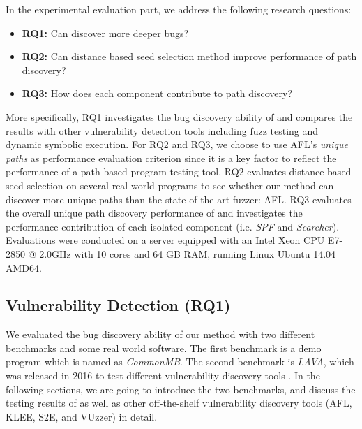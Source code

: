 In the experimental evaluation part, we address the following 
research questions:
\begin{itemize}
\setlength{\itemsep}{0pt}
\item {\textbf{RQ1:} Can \prototype discover more deeper bugs?}
\item {\textbf{RQ2:} Can distance based seed selection method 
	improve performance of path discovery?}
\item {\textbf{RQ3:} How does each component contribute to 
	path discovery?}
\end{itemize}

More specifically, RQ1 investigates the bug discovery ability of 
\prototype and compares the results with other vulnerability 
detection tools including fuzz testing and dynamic symbolic execution.
For RQ2 and RQ3, we choose to use AFL's \textit{unique paths} as performance evaluation criterion since it is a key factor to reflect the 
performance of a path-based program testing tool.
RQ2 evaluates distance based seed selection on several 
real-world programs to see whether our method can discover more 
unique paths than the state-of-the-art fuzzer: AFL. RQ3 evaluates 
the overall unique path discovery performance of \prototype and 
investigates the performance contribution of each isolated 
component (i.e. \textit{SPF} and \textit{Searcher}).
Evaluations were conducted on a server equipped
with an Intel Xeon CPU E7-2850 @ 2.0GHz with
10 cores and 64 GB RAM, running Linux Ubuntu 14.04 AMD64.

\subsection{Vulnerability Detection (RQ1)}
We evaluated the bug discovery ability of our method with two 
different benchmarks and some real world software. The first 
benchmark is a demo program which is named as \emph{CommonMB}. 
The second benchmark is \emph{LAVA}, which was released in 2016 
to test different vulnerability discovery tools \cite{dolan2016lava}. 
In the following sections, we are going to introduce the 
two benchmarks, and discuss the testing results of \prototype
as well as other off-the-shelf vulnerability discovery tools 
(AFL, KLEE, S2E, and VUzzer) in detail.

